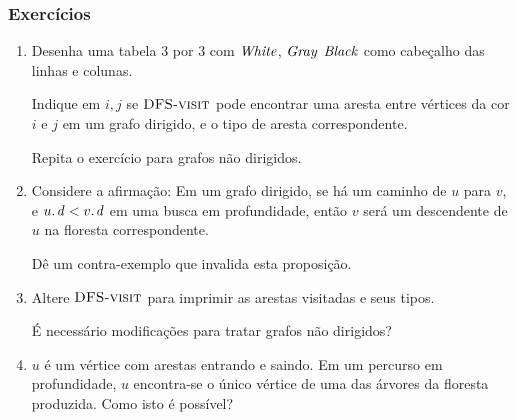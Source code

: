 \documentclass{beamer}
\begin{document}
\begin{frame}
\frametitle{Exercícios}

\begin{enumerate}
\item Desenha uma tabela 3 por 3 com $\id{White}$, $\id{Gray}$ $\id{Black}$ como
  cabeçalho das linhas e colunas.  

  Indique em $i, j$ se $\textnormal{\scshape DFS-visit}$ pode encontrar uma aresta entre
  vértices da cor $i$ e $j$ em um grafo dirigido, e o tipo de aresta correspondente.

  Repita o exercício para grafos não dirigidos.

\item Considere a afirmação: Em um grafo dirigido, se há um caminho
de $u$ para $v$, e $\attrib{u}{d} < \attrib{v}{d}$ em uma busca em profundidade,
então $v$ será um descendente de $u$ na floresta correspondente.

Dê um contra-exemplo que invalida esta proposição.

\item Altere $\textnormal{\scshape DFS-visit}$ para imprimir as arestas visitadas e seus tipos. 

É necessário modificações para tratar grafos não dirigidos?

\item $u$ é um vértice com arestas entrando e saindo. Em um percurso em
  profundidade, $u$ encontra-se o único vértice de uma das árvores da floresta
  produzida. Como isto é possível?
\end{enumerate}

\end{frame}
\end{document}
